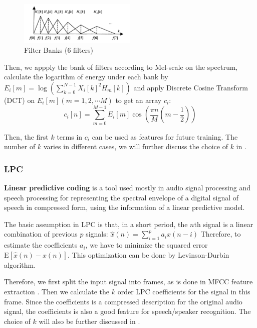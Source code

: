 \begin{figure}[H]
  \centering
  \includegraphics[width=0.5\textwidth]{img/bank.png}
  \caption{Filter Banks (6 filters) \label{fig:bank}}
\end{figure}
Then,  we appply the bank of filters according to Mel-scale on the spectrum,
calculate the logarithm of energy under each bank by $E_i[m] = \log (\sum_{k=0}^{N-1}{X_i[k]^2 H_m[k]}) $ and apply Discrete
Cosine Transform (DCT) on $E_i[m](m = 1, 2, \cdots M) $ to get an array $c_i $:
\[ c_i[n] = \sum_{m=0}^{M-1}{E_i[m]\cos(\dfrac{\pi n}{M}(m - \dfrac{1}{2}))} \]

Then, the first $k$ terms in $c_i $ can be used as features for future training.
The number of $k$ varies in different cases, we will further discuss the choice of $k$ in .

\subsubsection{LPC}
\textbf{Linear predictive coding} is a tool used mostly in audio signal processing and speech
processing for representing the spectral envelope of a
digital signal of speech in compressed form, using the information of a linear predictive model.\cite{lpc}

The basic assumption in LPC is that,
    in a short period, the $n$th signal is a linear combination of previous $p$ signals:
    $ \hat{x}(n) = \sum_{i=1}^pa_i x(n-i)$
    Therefore, to estimate the coefficients $ a_i$, we have to minimize the squared error
    $ \text{E}\left[ \hat{x}(n) - x(n)\right]$.
    This optimization can be done by Levinson-Durbin algorithm.\cite{levinson-durbin}

    Therefore, we first split the input signal into frames, as is done in MFCC feature extraction .
    Then we calculate the $k$ order LPC coefficients for the signal in this frame.
    Since the coefficients is a compressed description for the original audio signal,
    the coefficients is also a good feature for speech/speaker recognition.
    The choice of $k$ will also be further discussed in .

